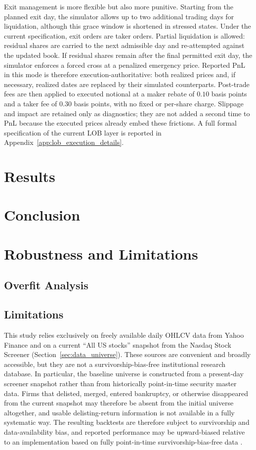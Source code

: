 \documentclass[11pt,a4paper]{article}
\begin{document}
Exit management is more flexible but also more punitive. Starting from the
planned exit day, the simulator allows up to two additional trading days for
liquidation, although this grace window is shortened in stressed states. Under
the current specification, exit orders are taker orders. Partial liquidation is
allowed: residual shares are carried to the next admissible day and re-attempted
against the updated book. If residual shares remain after the final permitted
exit day, the simulator enforces a forced cross at a penalized emergency price.
Reported PnL in this mode is therefore execution-authoritative: both realized
prices and, if necessary, realized dates are replaced by their simulated
counterparts. Post-trade fees are then applied to executed notional at a maker
rebate of \(0.10\) basis points and a taker fee of \(0.30\) basis points, with
no fixed or per-share charge. Slippage and impact are retained only as
diagnostics; they are not added a second time to PnL because the executed
prices already embed these frictions. A full formal specification of the
current LOB layer is reported in Appendix~\ref{app:lob_execution_details}.
\section{Results}
\section{Conclusion}


\section{Robustness and Limitations}\label{sec:robustness}
\subsection{Overfit Analysis}

\subsection{Limitations}\label{sec:limitations}

This study relies exclusively on freely available daily OHLCV data from Yahoo
Finance and on a current ``All US stocks'' snapshot from the Nasdaq Stock
Screener (Section~\ref{sec:data_universe}). These sources are convenient and
broadly accessible, but they are not a survivorship-bias-free institutional
research database. In particular, the baseline universe is constructed from a
present-day screener snapshot rather than from historically point-in-time
security master data. Firms that delisted, merged, entered bankruptcy, or
otherwise disappeared from the current snapshot may therefore be absent from the
initial universe altogether, and usable delisting-return information is not
available in a fully systematic way. The resulting backtests are therefore
subject to survivorship and data-availability bias, and reported performance may
be upward-biased relative to an implementation based on fully point-in-time
survivorship-bias-free data \cite{brown1992survivorship,elton1996survivorship,carhart2002mutual,shumway1997delisting}.
\end{document}
